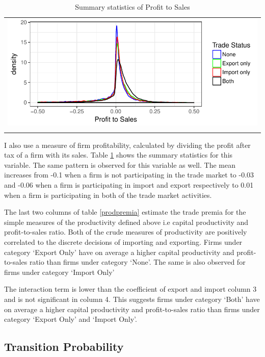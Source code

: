 \documentclass[12pt]{article}
\begin{document}
\begin{center}
\begin{table}[H]
\caption{Summary statistics of Profit to Sales}
\label{tab:pts}
\begin{tabular}{c}
 \includegraphics{./PICS/denspatsales.pdf}   \\ 
   \\  
\end{tabular}
\end{table}
\end{center}

I also use a measure of firm profitability, calculated by dividing the profit
after tax of
a firm with its sales. Table \ref{tab:pts} shows the summary
statistics for this variable. The same pattern is observed for this variable as well. The mean increases from -0.1 when a firm is not participating in
the trade market to -0.03 and  -0.06 when a firm is participating in
import and export respectively to 0.01 when a firm is participating in
both of the trade market activities.  

The last two columns of table \ref{prodpremia} estimate the trade
premia for the simple measures of the productivity defined above i.e
capital productivity and profit-to-sales ratio. Both
of the crude measures of productivity are positively correlated to the discrete
decisions of importing and exporting.  Firms under category `Export
Only' have on average a  higher
capital productivity and profit-to-sales ratio than firms under
category `None'. The same is also observed for firms under category
`Import Only'
  
 The interaction term is lower than the coefficient of export and
 import column 3 and 
is not significant in column 4. This suggests firms under category
`Both' have on average a higher capital productivity and profit-to-sales ratio than
firms under category `Export Only' and `Import Only'. 

\subsection{Transition Probability}
\end{document}

